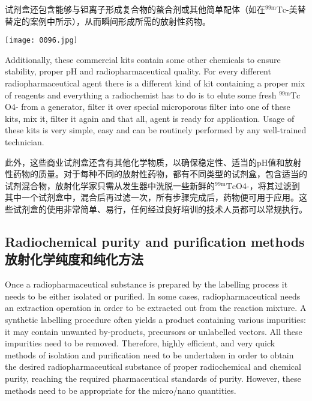 \documentclass[dvipsnames, svgnames,a4paper,11pt]{article}
\begin{document}
试剂盒还包含能够与钽离子形成复合物的螯合剂或其他简单配体（如在${}^\mathrm{99m}\mathrm{Tc}$-美替替定的案例中所示），从而瞬间形成所需的放射性药物。

\begin{figure*}[h]
    \centering
    \texttt{[image: 0096.jpg]}
\end{figure*}

Additionally, these commercial kits contain some other chemicals to ensure stability,
proper pH and radiopharmaceutical quality. For every different radiopharmaceutical
agent there is a different kind of kit containing a proper mix of reagents and
everything a radiochemist has to do is to elute some fresh ${}^\mathrm{99m}\mathrm{Tc}$O4- from a generator,
filter it over special microporous filter into one of these kits, mix it, filter it again and
that all, agent is ready for application. Usage of these kits is very simple, easy and
can be routinely performed by any well-trained technician.

此外，这些商业试剂盒还含有其他化学物质，以确保稳定性、适当的pH值和放射性药物的质量。对于每种不同的放射性药物，都有不同类型的试剂盒，包含适当的试剂混合物，放射化学家只需从发生器中洗脱一些新鲜的${}^\mathrm{99m}\mathrm{Tc}$O4-，将其过滤到其中一个试剂盒中，混合后再过滤一次，所有步骤完成后，药物便可用于应用。这些试剂盒的使用非常简单、易行，任何经过良好培训的技术人员都可以常规执行。

\subsection{Radiochemical purity and purification methods \\放射化学纯度和纯化方法}



Once a radiopharmaceutical substance is prepared by the labelling process it needs
to be either isolated or purified. In some cases, radiopharmaceutical needs an
extraction operation in order to be extracted out from the reaction mixture. A
synthetic labelling procedure often yields a product containing various impurities: it
may contain unwanted by-products, precursors or unlabelled vectors. All these
impurities need to be removed. Therefore, highly efficient, and very quick methods of
isolation and purification need to be undertaken in order to obtain the desired
radiopharmaceutical substance of proper radiochemical and chemical purity,
reaching the required pharmaceutical standards of purity. However, these methods
need to be appropriate for the micro/nano quantities.
\end{document}
